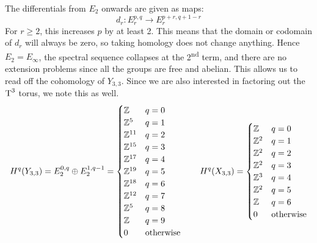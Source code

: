 The differentials from $E_2$ onwards are given as maps:
\[ d_r : E_r^{p,q} \to E_r^{p+r,q+1-r} \]
For $r\geq 2$, this increases $p$ by at least 2. This means that
the domain or codomain of $d_r$ will always be zero, so taking
homology does not change anything. Hence $E_2 = E_\infty$, the
spectral sequence collapses at the 2\textsuperscript{nd} term, and
there are no extension problems since all the groups are free and
abelian. This allows us to read off the cohomology of $Y_{3,3}$. Since
we are also interested in factoring out the $\operatorname{T}^3$ torus, we note this
as well.
\[ H^q(Y_{3,3}) = E_2^{0,q} \oplus E_2^{1,q-1} = 
\begin{cases}
  \mathbb{Z} & q = 0 \\
  \mathbb{Z}^{5} & q = 1\\
  \mathbb{Z}^{11} & q = 2\\
  \mathbb{Z}^{15} & q = 3\\
  \mathbb{Z}^{17} & q = 4\\
  \mathbb{Z}^{19} & q = 5\\
  \mathbb{Z}^{18} & q = 6\\
  \mathbb{Z}^{12} & q = 7\\
  \mathbb{Z}^{5} & q = 8\\
  \mathbb{Z} & q = 9\\
  0 & \text{otherwise} 
\end{cases} \qquad
H^q(X_{3,3}) =
\begin{cases}
  \mathbb{Z} & q = 0 \\
  \mathbb{Z}^{2} & q=1 \\
  \mathbb{Z}^{2} & q=2 \\
  \mathbb{Z}^{2} & q=3 \\
  \mathbb{Z}^{3} & q=4 \\
  \mathbb{Z}^{2} & q=5 \\
  \mathbb{Z} & q=6 \\
  0 & \text{otherwise}
\end{cases}
\]

